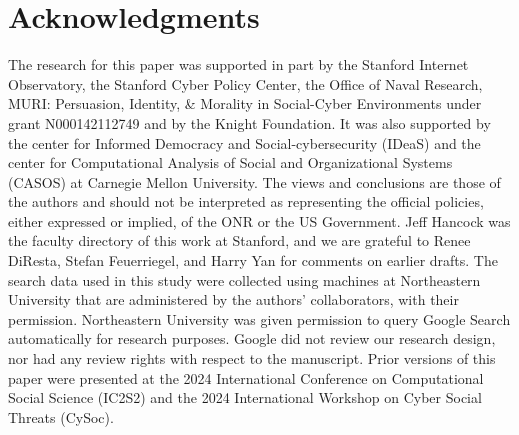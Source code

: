 \section{Acknowledgments}
The research for this paper was supported in part by the Stanford Internet Observatory, the Stanford Cyber Policy Center, the Office of Naval Research, MURI: Persuasion, Identity, \& Morality in Social-Cyber Environments under grant N000142112749 and by the Knight Foundation. It was also supported by the center for Informed Democracy and Social-cybersecurity  (IDeaS) and the center for Computational Analysis of Social and Organizational Systems (CASOS) at Carnegie Mellon University. The views and conclusions are those of the authors and should not be interpreted as representing the official policies, either expressed or implied, of the ONR or the US Government. 
Jeff Hancock was the faculty directory of this work at Stanford, and we are grateful to Renee DiResta, Stefan Feuerriegel, and Harry Yan for comments on earlier drafts.
The search data used in this study were collected using machines at Northeastern University that are administered by the authors' collaborators, with their permission. Northeastern University was given permission to query Google Search automatically for research purposes. Google did not review our research design, nor had any review rights with respect to the manuscript.
Prior versions of this paper were presented at the 2024 International Conference on Computational Social Science (IC2S2) and the 2024 International Workshop on Cyber Social Threats (CySoc).

